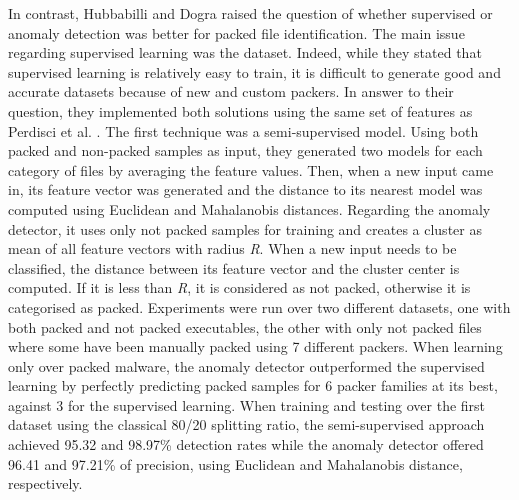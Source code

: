 In contrast, Hubbabilli and Dogra \cite{hubballi_detecting_2016} raised the question of whether supervised or anomaly detection was better for packed file identification. The main issue regarding supervised learning was the dataset. Indeed, while they stated that supervised learning is relatively easy to train, it is difficult to generate good and accurate datasets because of new and custom packers. In answer to their question, they implemented both solutions using the same set of features as Perdisci et al. \cite{perdisci_classification_2008}. The first technique was a semi-supervised model. Using both packed and non-packed samples as input, they generated two models for each category of files by averaging the feature values. Then, when a new input came in, its feature vector was generated and the distance to its nearest model was computed using Euclidean and Mahalanobis distances. Regarding the anomaly detector, it uses only not packed samples for training and creates a cluster as mean of all feature vectors with radius \textit{R}. When a new input needs to be classified, the distance between its feature vector and the cluster center is computed. If it is less than \textit{R}, it is considered as not packed, otherwise it is categorised as packed. Experiments were run over two different datasets, one with both packed and not packed executables, the other with only not packed files where some have been manually packed using 7 different packers. When learning only over packed malware, the anomaly detector outperformed the supervised learning by perfectly predicting packed samples for 6 packer families at its best, against 3 for the supervised learning. When training and testing over the first dataset using the classical 80/20 splitting ratio, the semi-supervised approach achieved 95.32 and 98.97\% detection rates while the anomaly detector offered 96.41 and 97.21\% of precision, using Euclidean and Mahalanobis distance, respectively. 


